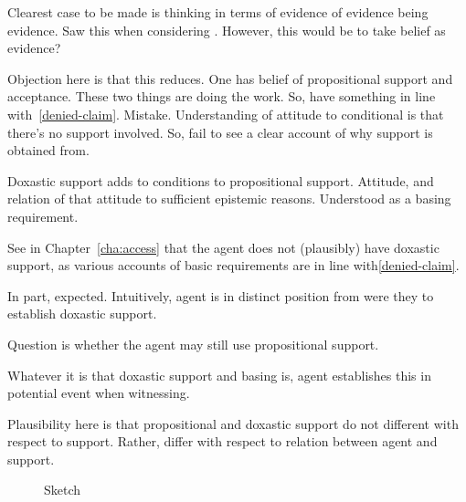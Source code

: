 \begin{note}[EEE]
  Clearest case to be made is thinking in terms of evidence of evidence being evidence.
  Saw this when considering \AR{}.
  However, this would be to take belief as evidence?
\end{note}

\begin{note}[Objection]
  Objection here is that this reduces.
  One has belief of propositional support and acceptance.
  These two things are doing the work.
  So, have something in line with~\ref{denied-claim}.
  Mistake.
  Understanding of attitude to conditional is that there's no support involved.
  So, fail to see a clear account of why support is obtained from.
\end{note}

\begin{note}
  Doxastic support adds to conditions to propositional support.
  Attitude, and relation of that attitude to sufficient epistemic reasons.
  Understood as a basing requirement.

  See in Chapter~\ref{cha:access} that the agent does not (plausibly) have doxastic support, as various accounts of basic requirements are in line with\ref{denied-claim}.

  In part, expected.
  Intuitively, agent is in distinct position from were they to establish doxastic support.

  Question is whether the agent may still use propositional support.
\end{note}

\begin{note}
  Whatever it is that doxastic support and basing is, agent establishes this in potential event when witnessing.

  Plausibility here is that propositional and doxastic support do not different with respect to support.
  Rather, differ with respect to relation between agent and support.
\end{note}

\begin{note}
  
\end{note}

\begin{figure}[h!]
  \centering
  \caption{Sketch}
\end{figure}

